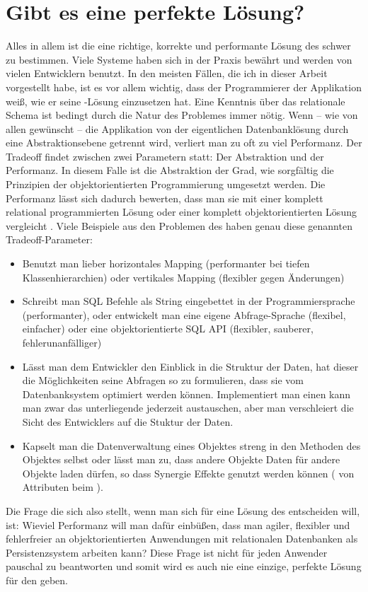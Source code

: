 \section{Gibt es eine perfekte Lösung?}
Alles in allem ist die eine richtige, korrekte und performante Lösung des \IMfull schwer zu bestimmen. Viele Systeme haben sich in der Praxis bewährt und werden von vielen Entwicklern benutzt. In den meisten Fällen, die ich in dieser Arbeit vorgestellt habe, ist es vor allem wichtig, dass der Programmierer der Applikation weiß, wie er seine \ORM-Lösung einzusetzen hat. Eine Kenntnis über das relationale Schema ist bedingt durch die Natur des Problemes immer nötig. Wenn -- wie von allen gewünscht -- die Applikation von der eigentlichen Datenbanklösung durch eine Abstraktionsebene getrennt wird, verliert man zu oft zu viel Performanz. Der Tradeoff findet zwischen zwei Parametern statt: Der Abstraktion und der Performanz. In diesem Falle ist die Abstraktion der Grad, wie sorgfältig die Prinzipien der objektorientierten Programmierung umgesetzt werden. Die Performanz lässt sich dadurch bewerten, dass man sie mit einer komplett relational programmierten Lösung oder einer komplett objektorientierten Lösung vergleicht \cite[Kap. 3]{comparative-study-orm-tools}. Viele Beispiele aus den Problemen des \IM haben genau diese genannten Tradeoff-Parameter:
\begin{itemize}
\item Benutzt man lieber horizontales Mapping (performanter bei tiefen Klassenhierarchien) oder vertikales Mapping (flexibler gegen Änderungen)
\item Schreibt man SQL Befehle als String eingebettet in der Programmiersprache (performanter), oder entwickelt man eine eigene Abfrage-Sprache (flexibel, einfacher) oder eine objektorientierte SQL API (flexibler, sauberer, fehlerunanfälliger)
\item Lässt man dem Entwickler den Einblick in die Struktur der Daten, hat dieser die Möglichkeiten seine Abfragen so zu formulieren, dass sie vom Datenbanksystem optimiert werden können. Implementiert man einen  kann man zwar das unterliegende \DBMS jederzeit austauschen, aber man verschleiert die Sicht des Entwicklers auf die Stuktur der Daten.
\item Kapselt man die Datenverwaltung eines Objektes streng in den Methoden des Objektes selbst oder lässt man zu, dass andere Objekte Daten für andere Objekte laden dürfen, so dass Synergie Effekte genutzt werden können ( von Attributen beim ).
\end{itemize}
Die Frage die sich also stellt, wenn man sich für eine Lösung des \IM entscheiden will, ist: Wieviel Performanz will man dafür einbüßen, dass man agiler, flexibler und fehlerfreier an objektorientierten Anwendungen mit relationalen Datenbanken als Persistenzsystem arbeiten kann? Diese Frage ist nicht für jeden Anwender pauschal zu beantworten und somit wird es auch nie eine einzige, perfekte Lösung für den \IM geben.
